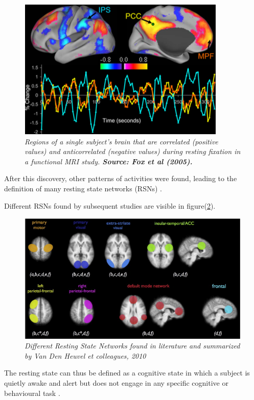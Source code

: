 \documentclass[12pt,openright,twoside,a4paper]{book}
\begin{document}
\begin{figure}[!h]
\centering
\includegraphics[scale=0.6]{default-mode}
\caption{\textit{Regions of a single subject's brain that are correlated (positive values) and anticorrelated (negative values) during resting  fixation in a functional MRI study. \textbf{Source: Fox et al (2005). \cite{DMN}}}}
\label{default-mode}
\end{figure}

After this discovery, other patterns of activities were found, leading to the definition of many resting state networks (RSNs) \cite{RNS}.

Different RSNs found by subsequent studies are visible in figure(\ref{resting-nws}).

\begin{figure}[!h]
\centering
\includegraphics[scale=0.6]{resting-nws}
\caption{\textit{Different Resting State Networks found in literature and summarized by Van Den Heuvel et colleagues, 2010 \cite{RNS}}}
\label{resting-nws}
\end{figure}



The resting state can thus be defined as a cognitive state in which a subject is quietly awake and alert but does not engage in any specific cognitive or behavioural task \cite{Rest-NTW}.
\end{document}
